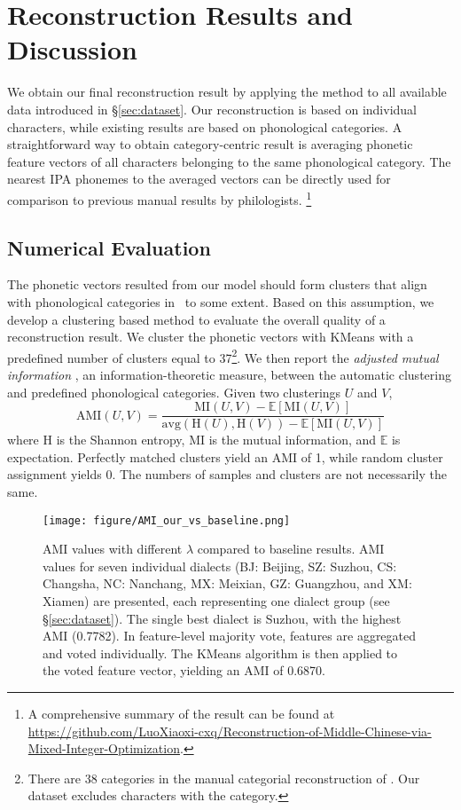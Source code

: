\section{Reconstruction Results and Discussion} 
\label{sec:main-result}
We obtain our final reconstruction result by applying the method to all available data introduced in \S\ref{sec:dataset}.
Our reconstruction is based on individual characters, while existing results are based on phonological categories. 
A straightforward way to obtain category-centric result is averaging phonetic feature vectors of all characters belonging to the same phonological category. 
The nearest IPA phonemes to the averaged vectors can be directly used for comparison to previous manual results by philologists.
\footnote{A comprehensive summary of the result can be found at \url{https://github.com/LuoXiaoxi-cxq/Reconstruction-of-Middle-Chinese-via-Mixed-Integer-Optimization}.}

\subsection{Numerical Evaluation} \label{sec:eval-AMI}
The phonetic vectors resulted from our model should form clusters that align with phonological categories in \gy~to some extent.
Based on this assumption, we develop a clustering based method to evaluate the overall quality of a reconstruction result. 
We cluster the phonetic vectors with KMeans with a predefined number of clusters equal to 37\footnote{There are 38 categories in the manual categorial reconstruction of \gy. 
Our dataset excludes characters with the  category.}.
We then report the \textit{adjusted mutual information}  \citep[AMI;][]{AMI-2010}, an information-theoretic measure, between the automatic clustering and predefined phonological categories. 
Given two clusterings $U$ and $V$, 
$$\mbox{AMI}(U,V)=\frac{\mbox{MI}(U, V) - \mathbb{E}[\mbox{MI}(U, V)]}{\mbox{avg}(\mbox{H}(U), \mbox{H}(V)) - \mathbb{E}[\mbox{MI}(U, V)]}$$
where $\mbox{H}$ is the Shannon entropy, $\mbox{MI}$ is the mutual information, and $\mathbb{E}$ is expectation.
Perfectly matched clusters yield an AMI of 1, while random cluster assignment yields 0.
The numbers of samples and clusters are not necessarily the same.

\begin{figure}[!t]
    \centering
    \texttt{[image: figure/AMI\_our\_vs\_baseline.png]}
    \caption{AMI values with different $\lambda$ compared to baseline results. 
    AMI values for seven individual dialects (BJ: Beijing, SZ: Suzhou, CS: Changsha, NC: Nanchang, MX: Meixian, GZ: Guangzhou, and XM: Xiamen) are presented, each representing one dialect group (see \S\ref{sec:dataset}).
    The single best dialect is Suzhou, with the highest AMI (0.7782). In feature-level majority vote, features are aggregated and voted individually. The KMeans algorithm is then applied to the voted feature vector, yielding an AMI of 0.6870.
    }
    \label{fig:AMI-our-baseline}
\end{figure}

